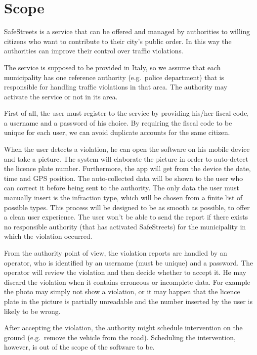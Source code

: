 \section{Scope}
SafeStreets is a service that can be offered and managed by authorities
to willing citizens who want to contribute to their city’s public order.
In this way the authorities can improve their control over traffic violations.

The service is supposed to be provided in Italy, so we assume that each
municipality has one reference authority (e.g.\ police department) that is
responsible for handling traffic violations in that area.
The authority may activate the service or not in its area.

First of all, the user must register to the service by providing his/her 
fiscal code, a username and a password of his choice.
By requiring the fiscal code to be unique for each user, we can avoid
duplicate accounts for the same citizen.

When the user detects a violation, he can open the software on his mobile 
device and take a picture. The system will elaborate the picture in order to 
auto-detect the licence plate number. Furthermore, the app will get from the 
device the date, time and GPS position. The auto-collected data will be shown 
to the user who can correct it before being sent to the authority.
The only data the user must manually insert is the infraction type, which 
will be chosen from a finite list of possible types.
This process will be designed to be as smooth as possible, to offer a clean 
user experience. The user won't be able to send the report if there exists
no responsible authority (that has activated SafeStreets) for the municipality
in which the violation occurred.

From the authority point of view, the violation reports are handled by
an operator, who is identified by an username (must be unique) and
a password.
The operator will review the violation and then decide whether to accept it.
He may discard the violation when it contains erroneous or incomplete data.
For example the photo may simply not show a violation, or it may happen that
the licence plate in the picture is partially unreadable and the number
inserted by the user is likely to be wrong.

After accepting the violation, the authority might schedule intervention
on the ground (e.g.\ remove the vehicle from the road).
Scheduling the intervention, however, is out of the scope of the software
to be.

